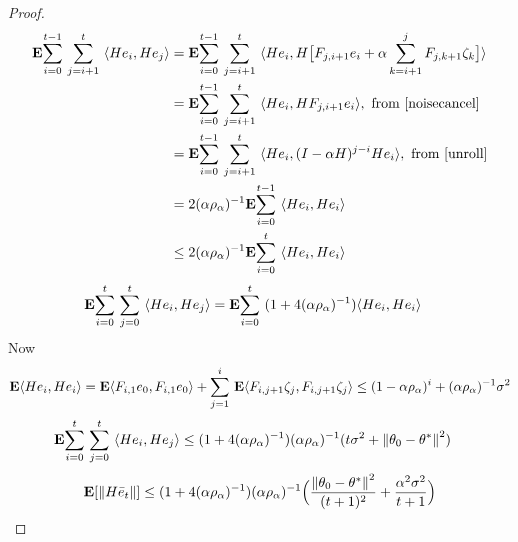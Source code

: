 \begin{proof}
\begin{align}\label{inter}
\E\ous{\sum}{i=0}{t-1}\ous{\sum}{j=i+1}{t}\ip{He_i,He_j}
&=\E\ous{\sum}{i=0}{t-1}\ous{\sum}{j=i+1}{t}\ip{He_i,H\big[F_{j,i+1} e_i+\alpha\sum_{k=i+1}^j F_{j,k+1}\zeta_{k}\big]}\nn\\
&=\E\ous{\sum}{i=0}{t-1}\ous{\sum}{j=i+1}{t}\ip{He_i,H F_{j,i+1} e_i},~\text{from \Cref{noisecancel}}\nn\\
&=\E\ous{\sum}{i=0}{t-1}\ous{\sum}{j=i+1}{t}\ip{He_i,(I-\alpha H)^{j-i}H e_i},~\text{from \Cref{unroll}}\nn\\
&=2(\alpha\rho_{\alpha})^{-1}\E\ous{\sum}{i=0}{t-1}\ip{He_i,H e_i}\nn\\
&\leq2(\alpha\rho_{\alpha})^{-1}\E\ous{\sum}{i=0}{t}\ip{He_i,H e_i}\nn\\
\end{align}
\begin{align*}
 \E\ous{\sum}{i=0}{t}\ous{\sum}{j=0}{t}\ip{He_i,He_j}&=\E\ous{\sum}{i=0}{t}(1+4(\alpha\rho_{\alpha})^{-1})\ip{He_i,He_i}
\end{align*}
Now
\begin{align*}
\E\ip{He_i,He_i}=\E\ip{F_{i,1}e_0,F_{i,1}e_0}+\ous{\sum}{j=1}{i}\E\ip{F_{i,j+1}\zeta_j,F_{i,j+1}\zeta_j}
\leq (1-\alpha\rho_{\alpha})^i+ (\alpha\rho_{\alpha})^{-1}\sigma^2
\end{align*}
\begin{align*}
\E\ous{\sum}{i=0}{t}\ous{\sum}{j=0}{t}\ip{He_i,He_j}&\leq (1+4(\alpha\rho_{\alpha})^{-1}) (\alpha\rho_{\alpha})^{-1}(t\sigma^2+\norm{\theta_0-\ts}^2)
\end{align*}
\begin{align}
\E[\norm{H\eb_t}]\leq (1+4(\alpha\rho_{\alpha})^{-1}) (\alpha\rho_{\alpha})^{-1} \Big(\frac{\norm{\theta_0-\ts}^2}{(t+1)^2}+ \frac{\alpha^2\sigma^2}{t+1} \Big)
\end{align}
\end{proof}

